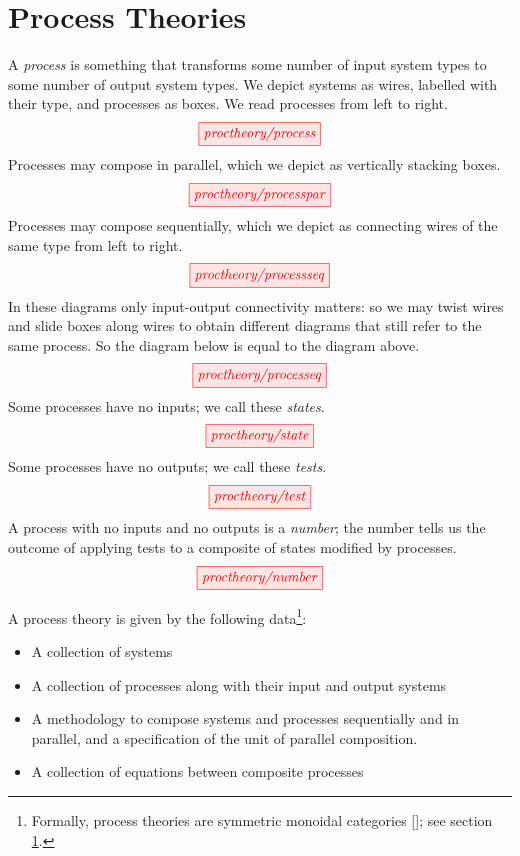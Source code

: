 \section{Process Theories}

A \emph{process} is something that transforms some number of input system types to some number of output system types. We depict systems as wires, labelled with their type, and processes as boxes. We read processes from left to right.
\[\tikzfig{proctheory/process}\]
Processes may compose in parallel, which we depict as vertically stacking boxes.
\[\tikzfig{proctheory/processpar}\]
Processes may compose sequentially, which we depict as connecting wires of the same type from left to right.
\[\tikzfig{proctheory/processseq}\]
In these diagrams only input-output connectivity matters: so we may twist wires and slide boxes along wires to obtain different diagrams that still refer to the same process. So the diagram below is equal to the diagram above.
\[\tikzfig{proctheory/processeq}\]
Some processes have no inputs; we call these \emph{states}. 
\[\tikzfig{proctheory/state}\]
Some processes have no outputs; we call these \emph{tests}.
\[\tikzfig{proctheory/test}\]
A process with no inputs and no outputs is a \emph{number}; the number tells us the outcome of applying tests to a composite of states modified by processes.
\[\tikzfig{proctheory/number}\]

A process theory is given by the following data\footnote{Formally, process theories are symmetric monoidal categories []; see section \ref{}.}:
\begin{itemize}
    \item A collection of systems
    \item A collection of processes along with their input and output systems
    \item A methodology to compose systems and processes sequentially and in parallel, and a specification of the unit of parallel composition.
    \item A collection of equations between composite processes
\end{itemize}

